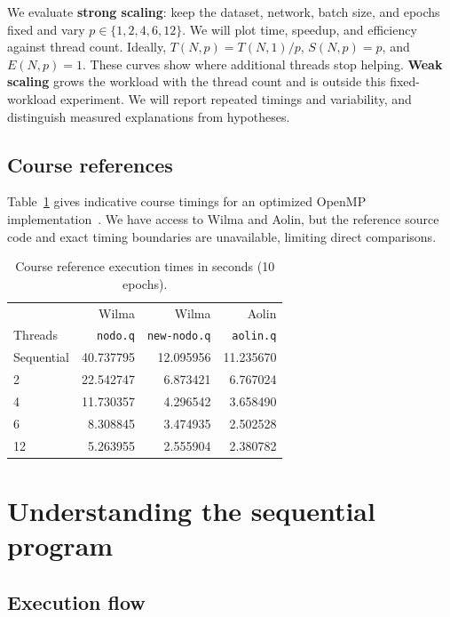 \documentclass[10pt,a4paper,twocolumn]{article}
\begin{document}
We evaluate \textbf{strong scaling}: keep the dataset, network, batch size,
and epochs fixed and vary $p\in\{1,2,4,6,12\}$. We will plot time, speedup,
and efficiency against thread count. Ideally, $T(N,p)=T(N,1)/p$,
$S(N,p)=p$, and $E(N,p)=1$. These curves show where additional threads stop
helping. \textbf{Weak scaling} grows the workload with the thread count and
is outside this fixed-workload experiment. We will report repeated timings
and variability, and distinguish measured explanations from hypotheses.

\subsection{Course references}

Table~\ref{tab:reference-times} gives indicative course timings for an
optimized OpenMP implementation~\cite{reference-times}. We have access to
Wilma and Aolin, but the reference source code and exact timing boundaries
are unavailable, limiting direct comparisons.

\begin{table}[htbp]
  \centering
  \caption{Course reference execution times in seconds (10 epochs).}
  \label{tab:reference-times}
  \small
  \setlength{\tabcolsep}{4pt}
  \begin{tabular}{@{}lrrr@{}}
    \toprule
    & Wilma & Wilma & Aolin \\
    Threads & \texttt{nodo.q} & \texttt{new-nodo.q} & \texttt{aolin.q} \\
    \midrule
    Sequential & 40.737795 & 12.095956 & 11.235670 \\
    2 & 22.542747 & 6.873421 & 6.767024 \\
    4 & 11.730357 & 4.296542 & 3.658490 \\
    6 & 8.308845 & 3.474935 & 2.502528 \\
    12 & 5.263955 & 2.555904 & 2.380782 \\
    \bottomrule
  \end{tabular}
\end{table}

\section{Understanding the sequential program}
\label{sec:sequential}

\subsection{Execution flow}
\end{document}

